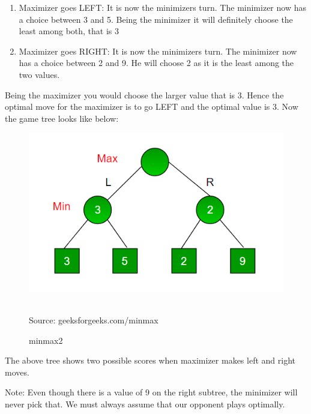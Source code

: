 \begin{enumerate}
    \item Maximizer goes LEFT: It is now the minimizers turn. The minimizer now has a choice between 3 and 5. Being the minimizer it will definitely choose the least among both, that is 3
    \item Maximizer goes RIGHT: It is now the minimizers turn. The minimizer now has a choice between 2 and 9. He will choose 2 as it is the least among the two values.
\end{enumerate}
Being the maximizer you would choose the larger value that is 3. Hence the optimal move for the maximizer is to go LEFT and the optimal value is 3.
Now the game tree looks like below:
\begin{figure}
    \centering
    \includegraphics[]{minmax1.png}
    \caption{minmax2}\\
    Source: geeksforgeeks.com/minmax
    \label{game5}
\end{figure}
The above tree shows two possible scores when maximizer makes left and right moves.

Note: Even though there is a value of 9 on the right subtree, the minimizer will never pick that. We must always assume that our opponent plays optimally.
